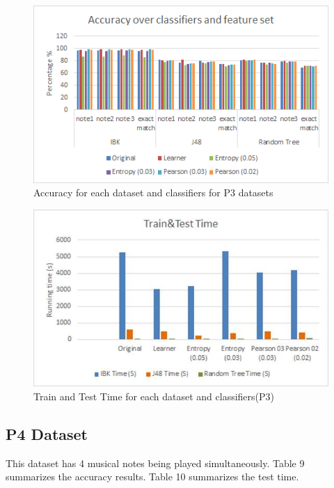 \documentclass{article}
\begin{document}
\begin{figure}[h]
\includegraphics[scale=.65]{accuracy_p3}
 \caption{Accuracy for each dataset and classifiers for P3 datasets}
\label{figure2}
\end{figure}
\begin{figure}[h]
\includegraphics[scale=.50]{time_p3}
 \caption{Train and Test Time for each dataset and classifiers(P3)}
\label{figure2}
\end{figure}


\subsection{P4 Dataset}
This dataset has 4 musical notes being played simultaneously. Table 9 summarizes the accuracy results. Table 10 summarizes the test time.

\end{document}
